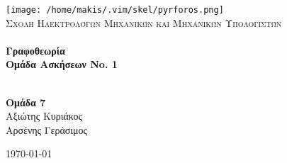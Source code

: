 \begin{titlepage}
\begin{center}

\texttt{[image: /home/makis/.vim/skel/pyrforos.png]}\\[1cm]

\textsc{\LARGE Σχολή Ηλεκτρολόγων Μηχανικών και Μηχανικών Υπολογιστών}\\[1.5cm]

\HRule \\[0.4cm]
{\huge \bfseries Γραφοθεωρία\\
\LARGE Ομάδα Ασκήσεων No. 1}\\[0.4cm]

\HRule \\[1.5cm]

\begin{center}
\textbf{Ομάδα 7}\\
Αξιώτης Κυριάκος\\
Αρσένης Γεράσιμος
\end{center}

\vfill

{\large \today}
\end{center}

\end{titlepage}
